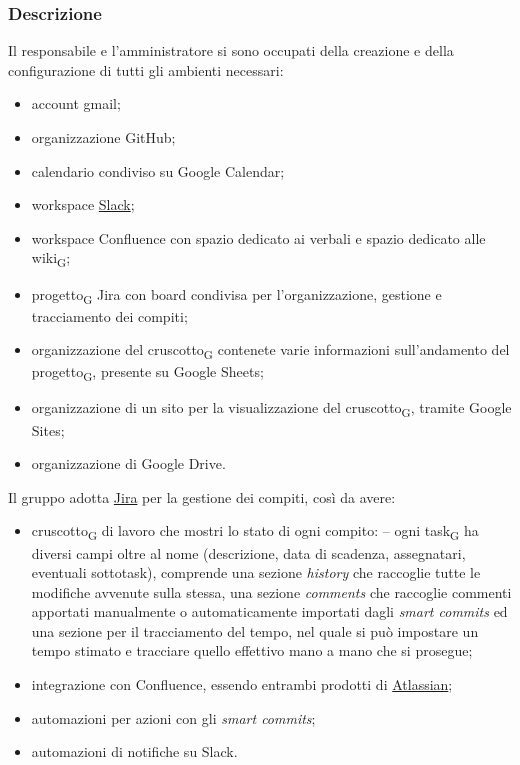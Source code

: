     \subsubsection{Descrizione}
    Il responsabile e l'amministratore si sono occupati della creazione e della configurazione di tutti gli ambienti necessari:
    \begin{itemize}
        \item account gmail;
        \item organizzazione GitHub;
        \item calendario condiviso su Google Calendar;
        \item workspace \href{https://slack.com/intl/en-it/about}{Slack};
        \item workspace Confluence con spazio dedicato ai verbali e spazio dedicato alle wiki\textsubscript{G};
        \item progetto\textsubscript{G} Jira con board condivisa per l'organizzazione, gestione e tracciamento dei compiti;
        \item organizzazione del cruscotto\textsubscript{G} contenete varie informazioni sull'andamento del progetto\textsubscript{G}, presente su Google Sheets;
        \item organizzazione di un sito per la visualizzazione del cruscotto\textsubscript{G}, tramite Google Sites;
        \item organizzazione di Google Drive.
    \end{itemize}
        Il gruppo adotta \href{https://www.atlassian.com/software/jira}{Jira} per la gestione dei compiti, così da avere:
        \begin{itemize}
            \item cruscotto\textsubscript{G} di lavoro che mostri lo stato di ogni compito:
                \subitem -- ogni task\textsubscript{G} ha diversi campi oltre al nome (descrizione, data di scadenza, assegnatari, eventuali sottotask), comprende una sezione \textit{history} che raccoglie tutte le modifiche avvenute sulla stessa, una sezione \textit{comments} che raccoglie commenti apportati manualmente o automaticamente importati dagli \textit{smart commits} ed una sezione per il tracciamento del tempo, nel quale si può impostare un tempo stimato e tracciare quello effettivo mano a mano che si prosegue;
            \item integrazione con Confluence, essendo entrambi prodotti di \href{https://www.atlassian.com/}{Atlassian};
            \item automazioni per azioni con gli \textit{smart commits};
            \item automazioni di notifiche su Slack.
        \end{itemize}
